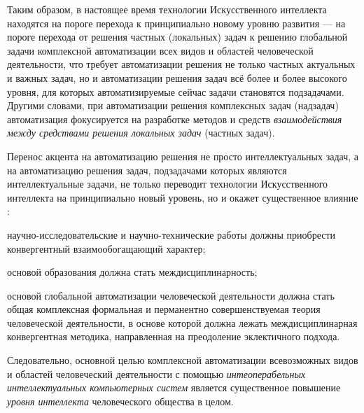 Таким образом, в настоящее время технологии Искусственного интеллекта находятся на пороге перехода к принципиально новому уровню развития --- на пороге перехода от решения частных (локальных) задач к решению глобальной задачи комплексной автоматизации всех видов и областей человеческой деятельности, что требует автоматизации решения не только частных актуальных и важных задач, но и автоматизации решения задач всё более и более высокого уровня, для которых автоматизируемые сейчас задачи становятся подзадачами. Другими словами, при автоматизации решения комплексных задач (надзадач) автоматизация фокусируется на разработке методов и средств \textit{взаимодействия между средствами решения локальных задач} (частных задач).

Перенос акцента на автоматизацию решения не просто интеллектуальных задач, а на автоматизацию решения  задач, подзадачами которых являются  интеллектуальные задачи, не только переводит технологии Искусственного интеллекта на принципиально новый уровень, но и окажет существенное влияние :
\begin{textitemize}
	\item  научно-исследовательские и научно-технические работы должны приобрести конвергентный взаимообогащающий характер;
	\item основой образования должна стать междисциплинарность;
	\item основой глобальной автоматизации человеческой деятельности должна стать общая комплексная формальная и перманентно совершенствуемая теория человеческой деятельности, в основе которой должна лежать междисциплинарная конвергентная методика, направленная на преодоление эклектичного подхода.
\end{textitemize}

Следовательно, основной целью комплексной автоматизации всевозможных видов и областей человеческий деятельности с помощью \textit{интеоперабельных интеллектуальных компьютерных систем} является существенное повышение \textit{уровня интеллекта}  человеческого общества в целом.

